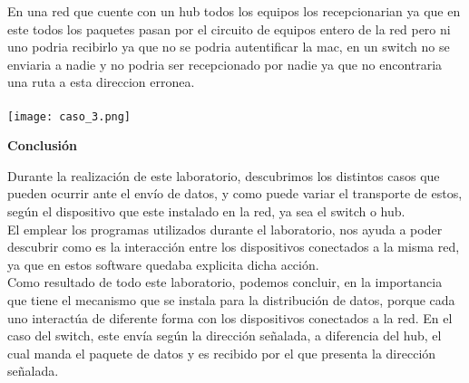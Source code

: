 \documentclass{article}
\begin{document}
En una red que cuente con un hub todos los equipos los recepcionarian ya que en este todos los paquetes pasan por el circuito de equipos entero de la red pero ni uno podria recibirlo ya que no se podria autentificar la mac, en un switch no se enviaria a nadie y no podria ser recepcionado por nadie ya que no encontraria una ruta a esta direccion erronea.\\
\\
\texttt{[image: caso\_3.png]}
\newpage
\begin{center}
{\LARGE \bfseries Conclusión }
\end{center}
Durante la realización de este laboratorio, descubrimos los distintos casos que pueden ocurrir ante el envío de datos, y como puede variar el transporte de estos, según el dispositivo que este instalado en la red, ya sea el switch o hub. \\

El emplear los programas utilizados durante el laboratorio, nos ayuda a poder descubrir como es la interacción entre los dispositivos conectados a la misma red, ya que en estos software quedaba explicita dicha acción. \\

Como resultado de todo este laboratorio, podemos concluir, en la importancia que tiene el mecanismo que se instala para la distribución de datos, porque cada uno interactúa de diferente forma con los dispositivos conectados a la red. En el caso del switch, este envía según la dirección señalada, a diferencia del hub, el cual manda el paquete de datos y es recibido por el que presenta la dirección señalada.\\
\end{document}
